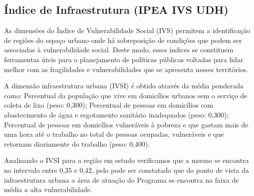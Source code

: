 \documentclass[letterpaper,10pt,brazil]{sphinxmanual}
\begin{document}
\subsection{Índice de Infraestrutura (IPEA IVS UDH)}
\label{\detokenize{exemplos/analise_domicilios:_xcdndice-de-Infraestrutura-(IPEA-IVS-UDH)}}
\sphinxAtStartPar
As dimensões do Índice de Vulnerabilidade Social (IVS) permitem a identificação de regiões do espaço urbano onde há sobreposição de condições que podem ser associadas à vulnerabilidade social. Deste modo, esses índices se constituem ferramentas úteis para o planejamento de políticas públicas voltadas para lidar melhor com as fragilidades e vulnerabilidades que se apresenta nesses territórios.

\sphinxAtStartPar
A dimensão infraestrutura urbana (IVS\sphinxhyphen{}I) é obtido através da média ponderada como: Percentual da população que vive em domicílios urbanos sem o serviço de coleta de lixo (peso: 0,300); Percentual de pessoas em domicílios com abastecimento de água e esgotamento sanitário inadequados (peso: 0,300); Percentual de pessoas em domicílios vulneráveis à pobreza e que gastam mais de uma hora até o trabalho no total de pessoas ocupadas, vulneráveis e que retornam diariamente do trabalho (peso: 0,400).

\sphinxAtStartPar
Analisando o IVS\sphinxhyphen{}I para a região em estudo verificamos que a mesmo se encontra no intervalo entre 0,35 e 0,42, pelo pode ser constatado que do ponto de vista da infraestrutura urbana a área de atuação do Programa se encontra na faixa de média a alta vulnerabilidade.
\end{document}

